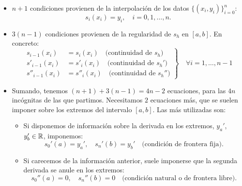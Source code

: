    \begin{itemize}
   \item $n+1$ condiciones provienen de la interpolación de los datos
     $\{(x_i, y_i)\}_{i=0}^n$:
     $$
     s_i(x_i)=y_i, \quad i=0,1,\dots,n.
     $$
   \item $3(n-1)$ condiciones provienen  de la regularidad de $s_h$ en
     $[a,b]$. En concreto:
     \begin{equation*}
       \left.
         \begin{aligned}
           s_{i-1}(x_i)&=s_{i}(x_i) \quad \text{(continuidad de $s_h$)}
           \\
           s'_{i-1}(x_i)&=s'_{i}(x_i) \quad \text{(continuidad de $s_h'$)}
           \\
           s''_{i-1}(x_i)&=s''_{i}(x_i) \quad \text{(continuidad de $s_h''$)}
         \end{aligned}
       \right\} \quad \forall i=1,\dots,n-1
     \end{equation*}
   \item Sumando, tenemos $(n+1) + 3(n-1) = 4n-2$ ecuaciones, para las
     $4n$ incógnitas de las que partimos. Necesitamos $2$ ecuaciones
     más, que se suelen imponer sobre los extremos del intervalo
     $[a,b]$. Las más utilizadas son:
     \begin{itemize}
     \item Si disponemos de información sobre la derivada en los
       extremos, $y_a'$, $y_b'\in\operatorname{{\mathbb R}}$, imponemos:
       \begin{equation*}
         s_0'(a)=y_a', \quad s_n'(b)=y_b' \quad \text{(condición de frontera fija)}.
       \end{equation*}
     \item Si carecemos de la información anterior, suele imponerse que
       la segunda derivada se anule en los extremos:
       \begin{equation*}
         s_0''(a)=0, \quad s_n''(b)=0 \quad \text{(condición natural o de
         frontera libre)}.
       \end{equation*}
     \end{itemize}
   \end{itemize}

